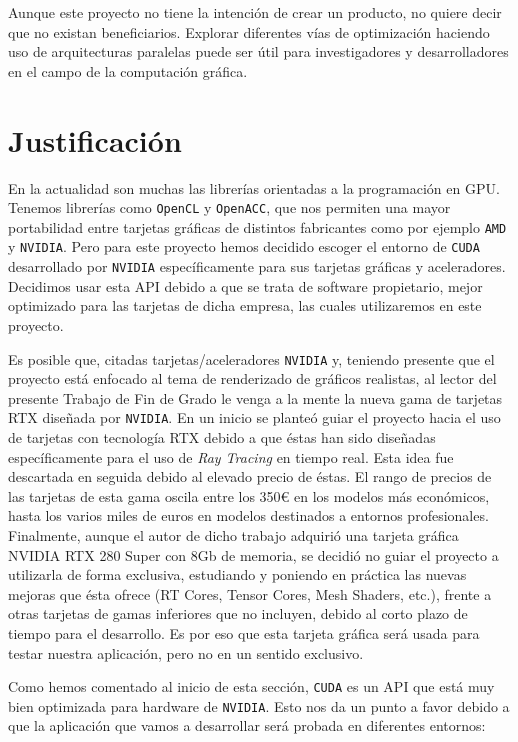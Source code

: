 \documentclass[titlepage,12pt]{report}
\begin{document}
Aunque este proyecto no tiene la intención de crear un producto, no quiere decir que no existan beneficiarios. Explorar diferentes vías de optimización haciendo uso de arquitecturas paralelas puede ser útil para investigadores y desarrolladores en el campo de la computación gráfica.

\section{Justificación}

En la actualidad son muchas las librerías orientadas a la programación en GPU. Tenemos librerías como \texttt{OpenCL} y \texttt{OpenACC}, que nos permiten una mayor portabilidad entre tarjetas gráficas de distintos fabricantes como por ejemplo \texttt{AMD} y \texttt{NVIDIA}. Pero para este proyecto hemos decidido escoger el entorno de \texttt{CUDA} desarrollado por \texttt{NVIDIA} específicamente para sus tarjetas gráficas y aceleradores. Decidimos usar esta API debido a que se trata de software propietario, mejor optimizado para las tarjetas de dicha empresa, las cuales utilizaremos en este proyecto.

Es posible que, citadas tarjetas/aceleradores \texttt{NVIDIA} y, teniendo presente que el proyecto está enfocado al tema de renderizado de gráficos realistas, al lector del presente Trabajo de Fin de Grado le venga a la mente la nueva gama de tarjetas RTX diseñada por \texttt{NVIDIA}. En un inicio se planteó guiar el proyecto hacia el uso de tarjetas con tecnología RTX debido a que éstas han sido diseñadas específicamente para el uso de \textit{Ray Tracing} en tiempo real. Esta idea fue descartada en seguida debido al elevado precio de éstas. El rango de precios de las tarjetas de esta gama oscila entre los 350€ en los modelos más económicos, hasta los varios miles de euros en modelos destinados a entornos profesionales. Finalmente, aunque el autor de dicho trabajo adquirió una tarjeta gráfica NVIDIA RTX 280 Super con 8Gb de memoria, se decidió no guiar el proyecto a utilizarla de forma exclusiva, estudiando y poniendo en práctica las nuevas mejoras que ésta ofrece (RT Cores, Tensor Cores, Mesh Shaders, etc.), frente a otras tarjetas de gamas inferiores que no incluyen, debido al corto plazo de tiempo para el desarrollo. Es por eso que esta tarjeta gráfica será usada para testar nuestra aplicación, pero no en un sentido exclusivo.

Como hemos comentado al inicio de esta sección, \texttt{CUDA} es un API que está muy bien optimizada para hardware de \texttt{NVIDIA}. Esto nos da un punto a favor debido a que la aplicación que vamos a desarrollar será probada en diferentes entornos:
\end{document}
